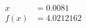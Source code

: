 \documentclass[preview]{standalone}
\begin{document}
\begin{align*}
x &= 0.0081\\f(x) &= 4.0212162
\end{align*}
\end{document}
